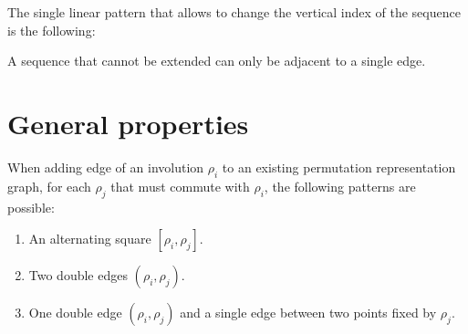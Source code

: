 \begin{proposition}
  \label{linear-pattern}
  The single linear pattern that allows to change the vertical index of the sequence is the following:

  \begin{figure}[H]
    \begin{center}
      \caption{}
    \end{center}
  \end{figure}

\end{proposition}

\begin{corollary}
  \label{sequence-connection}
  A sequence that cannot be extended can only be adjacent to a single edge.
\end{corollary}

\section{General properties}

\begin{proposition}
  \label{patterns-adding}
  When adding edge of an involution $\rho_i$ to an existing permutation representation graph, for each $\rho_j$ that must commute with $\rho_i$, the following patterns are possible:
  \begin{enumerate}
    \item An alternating square $[\rho_i, \rho_j]$.
    \item Two double edges $(\rho_i, \rho_j)$.
    \item One double edge $(\rho_i, \rho_j)$ and a single edge between two points fixed by $\rho_j$.
  \end{enumerate}
\end{proposition}

